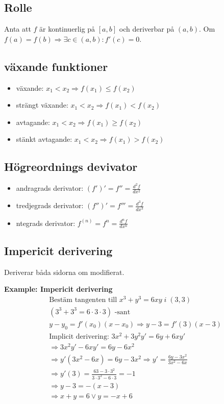\begin{multicols}{2}
  \subsection{Rolle} 
  Anta att $f$ är kontinuerlig på $[a,b]$ och deriverbar på $(a,b)$. 
  Om $f(a)=f(b) \Rightarrow \exists c \in (a,b):f'(c)=0$.


  \subsection{växande funktioner}
  \begin{itemize}
    \item växande:          $x_1<x_2 \Rightarrow f(x_1) \leq f(x_2)$
    \item strängt växande:  $x_1<x_2 \Rightarrow f(x_1) < f(x_2)$
    \item avtagande:        $x_1<x_2 \Rightarrow f(x_1) \geq f(x_2)$
    \item stänkt avtagande: $x_1<x_2 \Rightarrow f(x_1) > f(x_2)$
  \end{itemize}


  \subsection{Högreordnings devivator}
  \begin{itemize}
    \item andragrads derivator:   $(f')' = f''  =\frac{d^2f}{dx^2}$
    \item tredjegrads derivator:  $(f'')'= f''' =\frac{d^3f}{dx^3}$
    \item ntegrads derivator:     $f^{(n)}= f^{n}=\frac{d^{n}f}{dx^{n}}$
  \end{itemize}


  \subsection{Impericit derivering}
  Deriverar båda sidorna om modifierat.

  \textbf{Example: Impericit derivering}
  \begin{align*}
    &\text{Bestäm tangenten till } x^3+y^3=6xy \; i \; (3,3) \\
    &(3^3+3^3=6\cdot3\cdot3) \text{ -sant} \\
    &y-y_0=f'(x_0)(x-x_0) \Rightarrow y-3=f'(3)(x-3) \\
    &\text{Implicit derivering: } 3x^2+3y^2y'=6y+6xy' \\
    &\Rightarrow 3x^2y'-6xy'=6y-6x^2 \\
    &\Rightarrow y'(3x^2-6x)=6y-3x^2
    \Rightarrow y'=\frac{6y-3x^2}{3x^2-6x} \\
    &\Rightarrow y'(3)=\frac{63-3\cdot3^2}{3\cdot3^2-6\cdot3}=-1 \\
    &\Rightarrow y-3=-(x-3) \\
    &\Rightarrow x+y=6 \lor y=-x+6 \\
  \end{align*}



\end{multicols}
